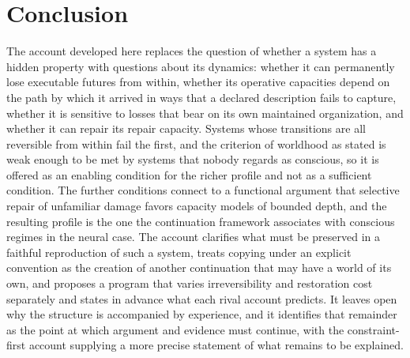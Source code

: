 \documentclass[11pt]{article}
\theoremstyle{definition}
\theoremstyle{plain}
\theoremstyle{remark}
\begin{document}
\section{Conclusion}

The account developed here replaces the question of whether a system has a hidden property with questions about its dynamics: whether it can permanently lose executable futures from within, whether its operative capacities depend on the path by which it arrived in ways that a declared description fails to capture, whether it is sensitive to losses that bear on its own maintained organization, and whether it can repair its repair capacity. Systems whose transitions are all reversible from within fail the first, and the criterion of worldhood as stated is weak enough to be met by systems that nobody regards as conscious, so it is offered as an enabling condition for the richer profile and not as a sufficient condition. The further conditions connect to a functional argument that selective repair of unfamiliar damage favors capacity models of bounded depth, and the resulting profile is the one the continuation framework associates with conscious regimes in the neural case. The account clarifies what must be preserved in a faithful reproduction of such a system, treats copying under an explicit convention as the creation of another continuation that may have a world of its own, and proposes a program that varies irreversibility and restoration cost separately and states in advance what each rival account predicts. It leaves open why the structure is accompanied by experience, and it identifies that remainder as the point at which argument and evidence must continue, with the constraint-first account supplying a more precise statement of what remains to be explained.
\end{document}
